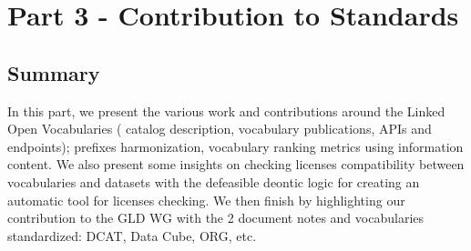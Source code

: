 \chapter*{Part 3 - Contribution to Standards}
\label{part:part3}
 
 \vspace{10mm}
\section*{Summary}
In this part, we present the various work and contributions around the Linked Open Vocabularies ( catalog description, vocabulary publications, APIs and endpoints); prefixes harmonization, vocabulary ranking metrics using information content. We also present some insights on checking licenses compatibility between vocabularies and datasets with the defeasible deontic logic for creating an automatic tool for licenses checking.  We then finish by highlighting our contribution to the GLD WG with the 2 document notes and vocabularies standardized: DCAT, Data Cube, ORG, etc. 
 